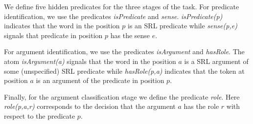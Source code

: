 


We define five hidden predicates for the three stages of the task. %
For predicate identification, we use the predicates \emph{isPredicate} and \emph{sense}. \emph{isPredicate(p)} indicates that the word in the position $p$ is an SRL predicate while \emph{sense(p,e)} signals that predicate in position $p$ has the sense $e$. %

For argument identification, we use the predicates \emph{isArgument} and \emph{hasRole}. The atom \emph{isArgument(a)} signals that the word in the position $a$ is a SRL argument of some (unspecified) SRL predicate while \emph{hasRole(p,a)} indicates that the token at position $a$ is an argument of the predicate in position $p$. 

Finally, for the argument classification stage we define the predicate \emph{role}. Here \emph{role(p,a,r)} corresponds to the decision that the argument $a$ has the role $r$ with respect to the predicate $p$.





